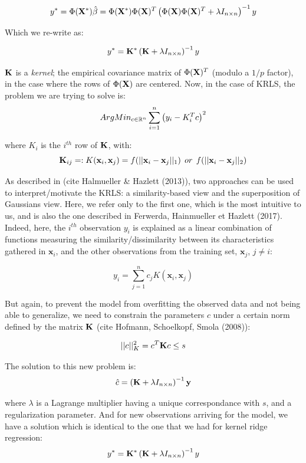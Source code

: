 $$
y^* = \Phi({\bf X^*})\hat{\beta} = \Phi({\bf X^*})\Phi({\bf X})^T \left( \Phi({\bf X})\Phi({\bf X})^T + \lambda I_{n \times n} \right)^{-1} y
$$

Which we re-write as:

$$
y^* =  {\bf K^*} \left( {\bf K} + \lambda I_{n \times n} \right)^{-1} y
$$

${\bf K}$ is a {\it kernel}; the empirical covariance matrix of $\Phi({\bf X})^T$ (modulo a $1/p$ factor), in the case where the rows of $\Phi({\bf X})$ are centered. Now, in the case of KRLS, the problem we are trying to solve is:
$$
ArgMin_{c \in \mathbb{R}^n} \sum_{i = 1}^n \left( y_i - K_i^T c \right)^2
$$

where $K_i$ is the $i^{th}$ row of ${\bf K}$, with:
$$
{\bf K}_{ij} =: K(\textbf{x}_i, \textbf{x}_j) = f(||\textbf{x}_i - \textbf{x}_j||_1) \: \: or \: \: f(||\textbf{x}_i - \textbf{x}_j||_2)
$$

As described in (cite Halmueller \& Hazlett (2013)), two approaches can be used to interpret/motivate the KRLS: a similarity-based view and the superposition of Gaussians view. Here, we refer only to the first one, which is the most intuitive to us, and is also the one described in Ferwerda, Hainmueller et Hazlett (2017). Indeed, here, the $i^{th}$ observation $y_i$ is explained as a linear combination of functions measuring the similarity/dissimilarity between its characteristics gathered in $\textbf{x}_i$, and the other observations from the training set, $\textbf{x}_j$, $j \neq i$:

\begin{equation}
\label{eq:comblinresponse}
y_i = \sum_{j = 1}^n c_j K(\textbf{x}_i, \textbf{x}_j)
\end{equation}

But again, to prevent the model from overfitting the observed data and not being able to generalize, we need to constrain the parameters $c$ under a certain norm defined by the matrix ${\bf K}$ (cite Hofmann, Schoelkopf, Smola (2008)):

$$
||c||^2_K = c^T {\bf K}  c  \leq s
$$

The solution to this new problem is:
$$
\hat{c} = \left( {\bf K}  + \lambda I_{n \times n} \right)^{-1}{\bf y}\\
$$

where $\lambda$ is a Lagrange multiplier having a unique correspondance with $s$, and a regularization parameter. And for new observations arriving for the model, we have a solution which is identical to the one that we had for kernel ridge regression:
$$
y^* =  {\bf K^*} \left( {\bf K} + \lambda I_{n \times n} \right)^{-1} y
$$


